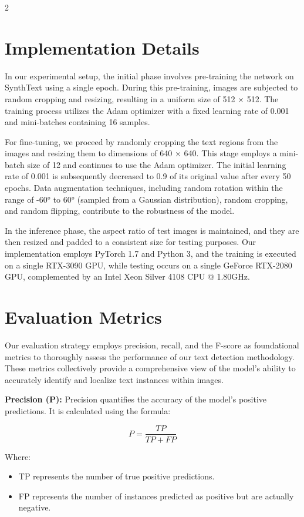 \documentclass[sn-mathphys,Numbered]{sn-jnl}%
\begin{document}
\begin{multicols}{2}
\section{Implementation Details}
In our experimental setup, the initial phase involves pre-training the network on SynthText using a single epoch. During this pre-training, images are subjected to random cropping and resizing, resulting in a uniform size of 512 × 512. The training process utilizes the Adam optimizer with a fixed learning rate of 0.001 and mini-batches containing 16 samples.

For fine-tuning, we proceed by randomly cropping the text regions from the images and resizing them to dimensions of 640 × 640. This stage employs a mini-batch size of 12 and continues to use the Adam optimizer. The initial learning rate of 0.001 is subsequently decreased to 0.9 of its original value after every 50 epochs. Data augmentation techniques, including random rotation within the range of -60° to 60° (sampled from a Gaussian distribution), random cropping, and random flipping, contribute to the robustness of the model.

In the inference phase, the aspect ratio of test images is maintained, and they are then resized and padded to a consistent size for testing purposes. Our implementation employs PyTorch 1.7 and Python 3, and the training is executed on a single RTX-3090 GPU, while testing occurs on a single GeForce RTX-2080 GPU, complemented by an Intel Xeon Silver 4108 CPU @ 1.80GHz.

\section{Evaluation Metrics}
Our evaluation strategy employs precision, recall, and the F-score as foundational metrics to thoroughly assess the performance of our text detection methodology. These metrics collectively provide a comprehensive view of the model's ability to accurately identify and localize text instances within images.

\textbf{Precision (P):} Precision quantifies the accuracy of the model's positive predictions. It is calculated using the formula:

\begin{equation}
P = \frac{TP}{TP + FP}
\end{equation}

Where: \\
\begin{itemize}
    \item TP represents the number of true positive predictions.
    \item FP represents the number of instances predicted as positive but are actually negative. \\
\end{itemize}


\end{multicols}
\end{document}
